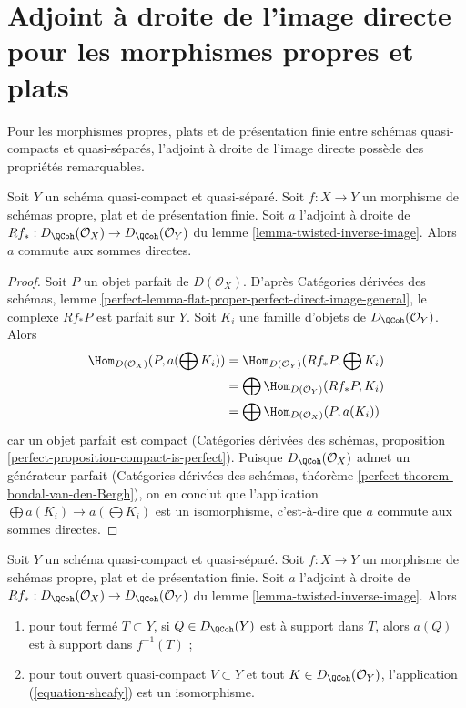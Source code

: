 \section{Adjoint à droite de l'image directe pour les morphismes propres et plats}
\label{section-proper-flat}

\noindent
Pour les morphismes propres, plats et de présentation finie entre schémas quasi-compacts et quasi-séparés, l'adjoint à droite de l'image directe possède des propriétés remarquables.

\begin{lemma}
\label{lemma-proper-flat}
Soit $Y$ un schéma quasi-compact et quasi-séparé. Soit $f : X \to Y$ un morphisme de schémas propre, plat et de présentation finie. Soit $a$ l'adjoint à droite de $Rf_* : D_\QCoh(\mathcal{O}_X) \to D_\QCoh(\mathcal{O}_Y)$ du lemme \ref{lemma-twisted-inverse-image}. Alors $a$ commute aux sommes directes.
\end{lemma}

\begin{proof}
Soit $P$ un objet parfait de $D(\mathcal{O}_X)$. D'après Catégories dérivées des schémas, lemme \ref{perfect-lemma-flat-proper-perfect-direct-image-general}, le complexe $Rf_*P$ est parfait sur $Y$. Soit $K_i$ une famille d'objets de $D_\QCoh(\mathcal{O}_Y)$. Alors
\begin{align*}
\Hom_{D(\mathcal{O}_X)}(P, a(\bigoplus K_i))
& =
\Hom_{D(\mathcal{O}_Y)}(Rf_*P, \bigoplus K_i) \\
& =
\bigoplus \Hom_{D(\mathcal{O}_Y)}(Rf_*P, K_i) \\
& =
\bigoplus \Hom_{D(\mathcal{O}_X)}(P, a(K_i))
\end{align*}
car un objet parfait est compact (Catégories dérivées des schémas, proposition \ref{perfect-proposition-compact-is-perfect}). Puisque $D_\QCoh(\mathcal{O}_X)$ admet un générateur parfait (Catégories dérivées des schémas, théorème \ref{perfect-theorem-bondal-van-den-Bergh}), on en conclut que l'application $\bigoplus a(K_i) \to a(\bigoplus K_i)$ est un isomorphisme, c'est-à-dire que $a$ commute aux sommes directes.
\end{proof}

\begin{lemma}
\label{lemma-proper-flat-relative}
Soit $Y$ un schéma quasi-compact et quasi-séparé. Soit $f : X \to Y$ un morphisme de schémas propre, plat et de présentation finie. Soit $a$ l'adjoint à droite de $Rf_* : D_\QCoh(\mathcal{O}_X) \to D_\QCoh(\mathcal{O}_Y)$ du lemme \ref{lemma-twisted-inverse-image}. Alors
\begin{enumerate}
\item pour tout fermé $T \subset Y$, si $Q \in D_\QCoh(Y)$ est à support dans $T$, alors $a(Q)$ est à support dans $f^{-1}(T)$ ;
\item pour tout ouvert quasi-compact $V \subset Y$ et tout $K \in D_\QCoh(\mathcal{O}_Y)$, l'application (\ref{equation-sheafy}) est un isomorphisme.
\end{enumerate}
\end{lemma}


